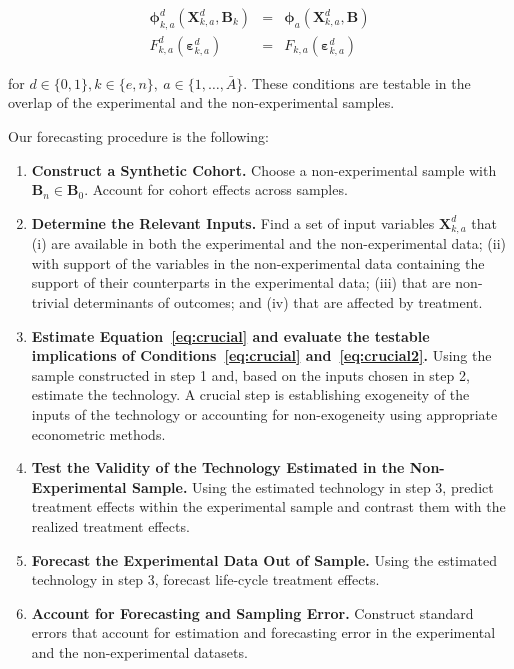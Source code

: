 \begin{subequations}
\begin{eqnarray}
\bm{\phi}^d_{k,a} (\bm{X}^d_{k,a}, \bm{B}_k) &=& \bm{\phi}_{a} (\bm{X}^d_{k,a}, \bm{B}) \label{eq:crucial} \\
F_{k,a}^d \left( \bm{\varepsilon}_{k,a}^d \right) &=&  F_{k,a} \left( \bm{\varepsilon}_{k,a}^d \right) \label{eq:crucial2}
\end{eqnarray}
\end{subequations}

\noindent for $d \in\{0,1\},  k\in\{e,n\}, \  a\in\{1,\dots,\bar{A}\}$. These conditions are testable in the overlap of the experimental and the non-experimental samples.

Our forecasting procedure is the following:

\begin{enumerate}
\item \textbf{Construct a Synthetic Cohort.} Choose a non-experimental sample with $\bm{B}_n \in \bm{B}_0$. Account for cohort effects across samples. 
\item \textbf{Determine the Relevant Inputs.} Find a set of input variables $\bm{X}^d_{k,a}$ that (i) are available in both the experimental and the non-experimental data; (ii) with support of the variables in the non-experimental data containing the support of their counterparts in the experimental data; (iii) that are non-trivial determinants of outcomes; and (iv) that are affected by treatment.
\item \textbf{Estimate Equation~\eqref{eq:crucial} and evaluate the testable implications of Conditions~\eqref{eq:crucial} and~\eqref{eq:crucial2}.} Using the sample constructed in step 1 and, based on the inputs chosen in step 2, estimate the technology. A crucial step is establishing exogeneity of the inputs of the technology or accounting for non-exogeneity using appropriate econometric methods.
\item \textbf{Test the Validity of the Technology Estimated in the Non-Experimental Sample.} Using the estimated technology in step 3, predict treatment effects within the experimental sample and contrast them with the realized treatment effects.
\item \textbf{Forecast the Experimental Data Out of Sample.} Using the estimated technology in step 3, forecast life-cycle treatment effects.
\item \textbf{Account for Forecasting and Sampling Error.} Construct standard errors that account for estimation and forecasting error in the experimental and the non-experimental datasets.
\end{enumerate}

